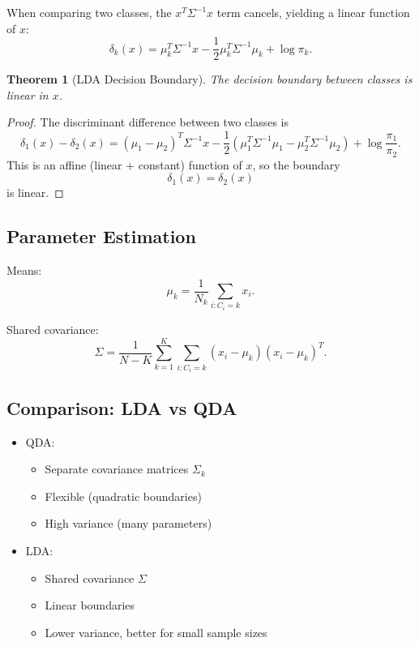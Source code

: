 \documentclass[12pt,oneside]{book}
\numberwithin{equation}{section}
\theoremstyle{definition}
\theoremstyle{plain}
\newtheorem{theorem}{Theorem}[section]
\theoremstyle{remark}
\begin{document}
When comparing two classes, the $x^T\Sigma^{-1}x$ term cancels, yielding a linear function of $x$:
\[
\delta_k(x)
=
\mu_k^T\Sigma^{-1}x
-
\frac{1}{2}\mu_k^T\Sigma^{-1}\mu_k
+
\log \pi_k.
\]

\begin{theorem}[LDA Decision Boundary]
The decision boundary between classes is linear in $x$.
\end{theorem}

\begin{proof}
The discriminant difference between two classes is
\[
\delta_1(x)-\delta_2(x)
=
(\mu_1-\mu_2)^T\Sigma^{-1}x
-
\frac{1}{2}
\left(
\mu_1^T\Sigma^{-1}\mu_1
-
\mu_2^T\Sigma^{-1}\mu_2
\right)
+
\log \frac{\pi_1}{\pi_2}.
\]
This is an affine (linear + constant) function of $x$, so the boundary
\[
\delta_1(x)=\delta_2(x)
\]
is linear.
\end{proof}

\subsection{Parameter Estimation}

Means:
\[
\mu_k
=
\frac{1}{N_k}\sum_{i:C_i=k} x_i.
\]

Shared covariance:
\[
\Sigma
=
\frac{1}{N-K}
\sum_{k=1}^K
\sum_{i:C_i=k}
(x_i-\mu_k)(x_i-\mu_k)^T.
\]

\subsection{Comparison: LDA vs QDA}

\begin{itemize}
    \item QDA:
    \begin{itemize}
        \item Separate covariance matrices $\Sigma_k$
        \item Flexible (quadratic boundaries)
        \item High variance (many parameters)
    \end{itemize}
    \item LDA:
    \begin{itemize}
        \item Shared covariance $\Sigma$
        \item Linear boundaries
        \item Lower variance, better for small sample sizes
    \end{itemize}
\end{itemize}
\end{document}
